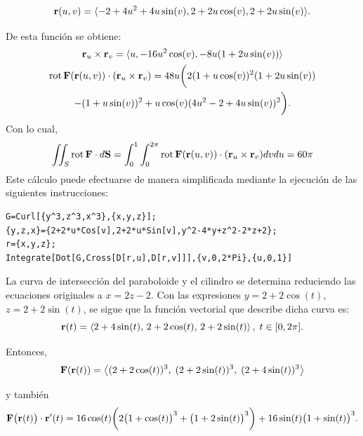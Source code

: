 \clearpage

\vspace*{-2\baselineskip}

\begingroup
\setlength{\abovedisplayskip}{0pt}
\setlength{\abovedisplayshortskip}{0pt}
\[{\bf r}(u,v)=\langle -2+4u^2+4u\sin(v),2+2u\cos(v),2+2u\sin(v)\rangle.\]
\endgroup

De esta función se obtiene:
\begin{gather*}
{\bf r}_u \times {\bf r}_v=\langle u,-16u^2\cos(v),-8u(1+2u\sin(v)) \rangle \\
{\rm rot\,}{\bf F}({\bf r}(u,v)) \cdot ({\bf r}_u \times {\bf r}_v) = 48u\bigg(2(1+u\cos(v))^2(1+2u\sin(v))\\
-(1+u\sin(v))^2+u\cos(v)(4u^2-2+4u\sin(v))^2 \bigg ).
\end{gather*}
Con lo cual,
\begin{equation} \label{stokes1}
\iint_S {\rm rot\,}{\bf F}\cdot d{\bf S}=\int_0^1\int_0^{2\pi}{\rm rot\,}{\bf F}({\bf r}(u,v))\cdot({\bf r}_u\times{\bf r}_v) dvdu = 60 \pi
\end{equation}
Este cálculo puede efectuarse de manera simplificada mediante la ejecución de las siguientes instrucciones:

\begin{tcolorbox}[title=\bf Instrucción \verb"Mathematica"]\begin{Verbatim}[formatcom=\letraverbatim]
G=Curl[{y^3,z^3,x^3},{x,y,z}];
{y,z,x}={2+2*u*Cos[v],2+2*u*Sin[v],y^2-4*y+z^2-2*z+2};
r={x,y,z};
Integrate[Dot[G,Cross[D[r,u],D[r,v]]],{v,0,2*Pi},{u,0,1}]
\end{Verbatim}
\end{tcolorbox}

La curva de intersección del paraboloide y el cilindro se determina reduciendo las ecuaciones originales a
$x = 2z - 2$. Con las expresiones $y = 2 + 2\cos(t)$, $z = 2 + 2\sin(t)$, se sigue que la función vectorial que describe dicha curva es:
\[{\bf r}(t) = \left\langle 2 + 4\sin(t),\, 2 + 2\cos(t),\, 2 + 2\sin(t) \right\rangle,\; t \in [0, 2\pi].\]

Entonces,
\[
{\bf F}({\bf r}(t)) =
\left\langle
(2 + 2\cos(t))^3,\;
(2 + 2\sin(t))^3,\;
(2 + 4\sin(t))^3
\right\rangle
\]

y también
\begin{gather*}
{\bf F}\big({\bf r}(t)\big) \cdot {\bf r}'(t) =
16\cos(t)\bigg(2\big(1 + \cos(t)\big)^3 + \big(1 + 2\sin(t)\big)^3\bigg)
+ 16\sin(t)\big(1 + \sin(t)\big)^3.
\end{gather*}

